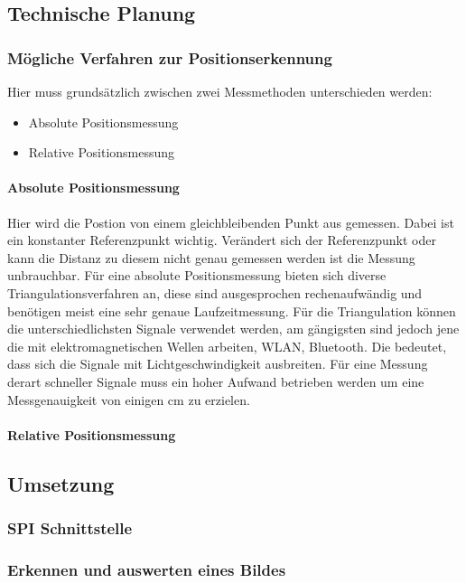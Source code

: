   \subsection{Technische Planung}
    \subsubsection{Mögliche Verfahren zur Positionserkennung}
    Hier muss grundsätzlich zwischen zwei Messmethoden unterschieden werden:
    \begin{itemize}
      \item Absolute Positionsmessung
      \item Relative Positionsmessung
    \end{itemize}
    \paragraph{Absolute Positionsmessung}
    Hier wird die Postion von einem gleichbleibenden Punkt aus gemessen. Dabei ist ein konstanter Referenzpunkt wichtig. Verändert sich der Referenzpunkt oder kann die Distanz zu diesem nicht genau gemessen werden ist die Messung unbrauchbar.
    Für eine absolute Positionsmessung bieten sich diverse Triangulationsverfahren an, diese sind ausgesprochen rechenaufwändig und benötigen meist eine sehr genaue Laufzeitmessung. Für die Triangulation können die unterschiedlichsten Signale verwendet werden, am gängigsten sind jedoch jene die mit elektromagnetischen Wellen arbeiten, \zB WLAN, Bluetooth. Die bedeutet, dass sich die Signale mit Lichtgeschwindigkeit ausbreiten.
    Für eine Messung derart schneller Signale muss ein hoher Aufwand betrieben werden um eine Messgenauigkeit von einigen cm zu erzielen.

    \paragraph{Relative Positionsmessung}

  \subsection{Umsetzung}

    \subsubsection{SPI Schnittstelle}

    \subsubsection{Erkennen und auswerten eines Bildes}

